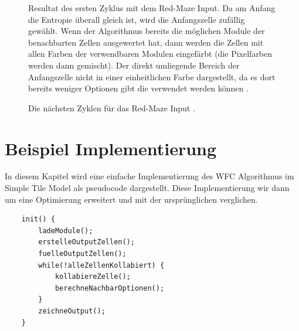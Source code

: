 \documentclass[12pt, a4paper,twoside,openany]{report} %
\begin{document}
\begin{figure}[H]
    \centering
    \caption{
        Resultat des ersten Zyklus mit dem Red-Maze Input. Da am Anfang die Entropie überall gleich ist, wird die Anfangszelle zufällig gewählt.
        Wenn der Algorithmus bereits die möglichen Module der benachbarten Zellen ausgewertet hat, dann werden die Zellen mit allen Farben der verwendbaren Modulen eingefärbt
        {(die Pixelfarben werden dann gemischt)}.
        Der direkt umliegende Bereich der Anfangszelle nicht in einer einheitlichen Farbe dargestellt, da es dort bereits weniger Optionen gibt die verwendet werden können \cite{Karth2017WaveFunctionCollapseIC}.
    }%
\end{figure}

\begin{figure}[H]
    \centering
    \caption{Die nächsten Zyklen für das Red-Maze Input \cite{Karth2017WaveFunctionCollapseIC}.}%
\end{figure}

\pagebreak

\section{Beispiel Implementierung}

In diesem Kapitel wird eine einfache Implementierung des WFC Algorithmus im Simple Tile Model als pseudocode dargestellt.
Diese Implementierung wir dann um eine Optimierung erweitert und mit der ursprünglichen verglichen.

\begin{lstlisting}
    init() {
        ladeModule();
        erstelleOutputZellen();
        fuelleOutputZellen();
        while(!alleZellenKollabiert) {
            kollabiereZelle();
            berechneNachbarOptionen();
        }
        zeichneOutput();
    }
\end{lstlisting}
\end{document}
